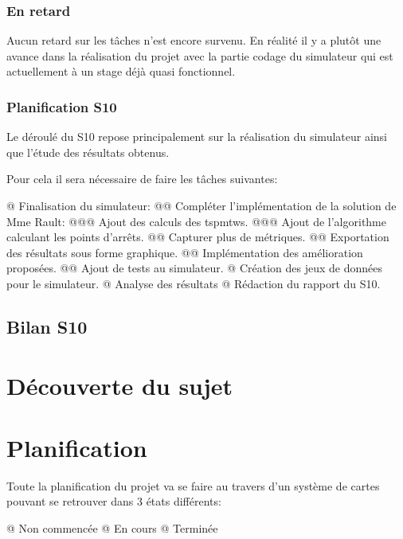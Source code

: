 \documentclass[noposter,final]{polytech/polytech}
\begin{document}
		\subsection{En retard}
			Aucun retard sur les tâches n'est encore survenu.
			En réalité il y a plutôt une avance dans la réalisation du projet avec la partie codage du simulateur qui est actuellement à un stage déjà quasi fonctionnel.
			
		\subsection{Planification S10}
			Le déroulé du S10 repose principalement sur la réalisation du simulateur ainsi que l'étude des résultats obtenus.
			
			Pour cela il sera nécessaire de faire les tâches suivantes:
			\begin{easylist}[itemize]
				@ Finalisation du simulateur:
				@@ Compléter l'implémentation de la solution de Mme Rault:
				@@@ Ajout des calculs des \glspl{tspmtw}.
				@@@ Ajout de l'algorithme calculant les points d'arrêts.
				@@ Capturer plus de métriques.
				@@ Exportation des résultats sous forme graphique.
				@@ Implémentation des amélioration proposées.
				@@ Ajout de tests au simulateur.
				@ Création des jeux de données pour le simulateur.
				@ Analyse des résultats
				@ Rédaction du rapport du S10.
			\end{easylist}

		
	\section{Bilan S10}
	
\appendix
\chapter{Découverte du sujet}
	
\chapter{Planification\label{sec:plannification}}
	Toute la planification du projet va se faire au travers d'un système de cartes pouvant se retrouver dans 3 états différents:
	\begin{easylist}
		@ Non commencée
		@ En cours
		@ Terminée	
	\end{easylist}
	
\end{document}
